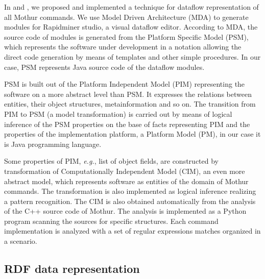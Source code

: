 \documentclass[a4paper]{jpconf}
\begin{document}

In \cite{cherk19} and \cite{zont19}, we proposed and implemented a technique for dataflow representation of all Mothur commands.  We use Model Driven Architecture (MDA) to generate modules for Rapidminer studio, a visual dataflow editor.  According to MDA, the source code of modules is generated from the Platform Specific Model (PSM), which represents the software under development in a notation allowing the direct code generation by means of templates and other simple procedures.  In our case, PSM represents Java source code of the dataflow modules.

PSM is built out of the Platform Independent Model (PIM) representing the software on a more abstract level than PSM.  It expresses the relations between entities, their object structures, metainformation and so on.  The transition from PIM to PSM (a model transformation) is carried out by means of logical inference of the PSM properties on the base of facts representing PIM and the properties of the implementation platform, a Platform Model (PM), in our case it is Java programming language.

Some properties of PIM, \emph{e.g.}, list of object fields, are constructed by transformation of Computationally Independent Model (CIM), an even more abstract model, which represents software as entities of the domain of Mothur commands.  The transformation is also implemented as logical inference realizing a pattern recognition.  The CIM is also obtained automatically from the analysis of the C++ source code of Mothur. The analysis is implemented as a Python program scanning the sources for specific structures.  Each command implementation is analyzed with a set of regular expressions matches organized in a scenario.

\subsection{RDF data representation}
\end{document}
